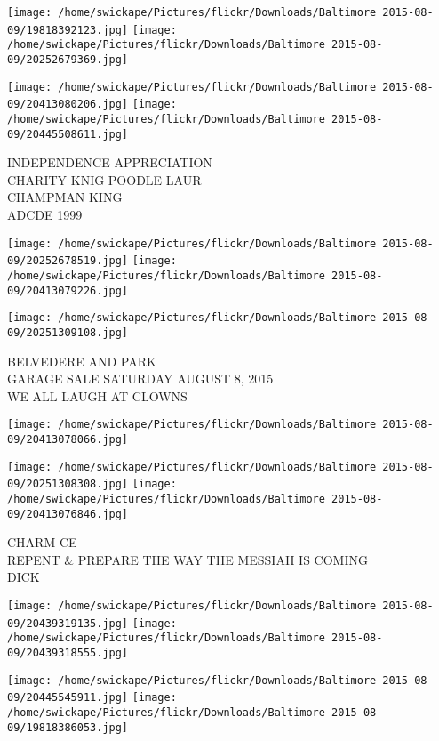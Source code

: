 \documentclass[10pt,letterpaper]{article}
\begin{document}
\texttt{[image: /home/swickape/Pictures/flickr/Downloads/Baltimore 2015-08-09/19818392123.jpg]}
\texttt{[image: /home/swickape/Pictures/flickr/Downloads/Baltimore 2015-08-09/20252679369.jpg]}

\texttt{[image: /home/swickape/Pictures/flickr/Downloads/Baltimore 2015-08-09/20413080206.jpg]}
\texttt{[image: /home/swickape/Pictures/flickr/Downloads/Baltimore 2015-08-09/20445508611.jpg]}

INDEPENDENCE APPRECIATION\\
CHARITY KNIG POODLE LAUR\\
CHAMPMAN KING\\
ADCDE 1999
\pagebreak

\texttt{[image: /home/swickape/Pictures/flickr/Downloads/Baltimore 2015-08-09/20252678519.jpg]}
\texttt{[image: /home/swickape/Pictures/flickr/Downloads/Baltimore 2015-08-09/20413079226.jpg]}

\vspace{0.25in}
\texttt{[image: /home/swickape/Pictures/flickr/Downloads/Baltimore 2015-08-09/20251309108.jpg]}

BELVEDERE AND PARK\\
GARAGE SALE SATURDAY AUGUST 8, 2015\\
WE ALL LAUGH AT CLOWNS
\pagebreak

\texttt{[image: /home/swickape/Pictures/flickr/Downloads/Baltimore 2015-08-09/20413078066.jpg]}

\vspace{0.25in}
\texttt{[image: /home/swickape/Pictures/flickr/Downloads/Baltimore 2015-08-09/20251308308.jpg]}
\texttt{[image: /home/swickape/Pictures/flickr/Downloads/Baltimore 2015-08-09/20413076846.jpg]}

CHARM CE\\
REPENT \& PREPARE THE WAY THE MESSIAH IS COMING\\
DICK
\pagebreak

\texttt{[image: /home/swickape/Pictures/flickr/Downloads/Baltimore 2015-08-09/20439319135.jpg]}
\texttt{[image: /home/swickape/Pictures/flickr/Downloads/Baltimore 2015-08-09/20439318555.jpg]}

\texttt{[image: /home/swickape/Pictures/flickr/Downloads/Baltimore 2015-08-09/20445545911.jpg]}
\texttt{[image: /home/swickape/Pictures/flickr/Downloads/Baltimore 2015-08-09/19818386053.jpg]}
\end{document}
